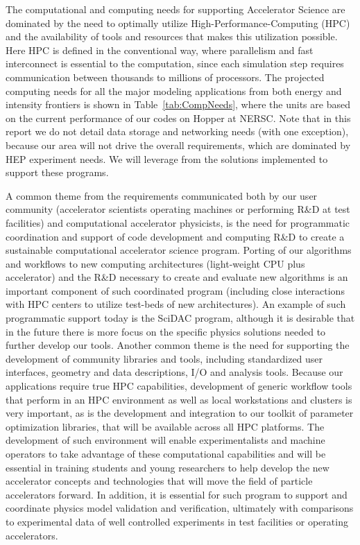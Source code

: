 The computational and computing needs for supporting Accelerator
Science are dominated by the need to optimally utilize
High-Performance-Computing (HPC) and the availability of tools
and resources that makes this utilization possible.  Here HPC is
defined in the conventional way, where parallelism and fast
interconnect is essential to the computation, since each
simulation step requires communication between thousands to
millions of processors. The projected computing  needs for all
the major modeling applications from both energy and intensity
frontiers is shown in Table~\ref{tab:CompNeeds}, where the units
are based on the current performance of our codes on Hopper at
NERSC. Note that in this report we do not detail data storage and
networking needs (with one exception), because our area will not
drive the overall requirements, which are dominated by HEP
experiment needs.  We will leverage from the solutions
implemented to support these programs.

A common theme from the requirements communicated both by our
user community (accelerator scientists operating machines or
performing R\&D at test facilities) and computational accelerator
physicists, is the need for programmatic coordination and support
of code development and computing R\&D to create a sustainable
computational accelerator science program.  Porting of our
algorithms and workflows to new computing architectures
(light-weight CPU plus accelerator) and the R\&D necessary to
create and evaluate new algorithms is an important component of
such coordinated program (including close interactions with HPC
centers to utilize test-beds of new architectures). An example of
such programmatic support today is the SciDAC program, although
it is desirable that in the future there is more focus on the
specific physics solutions needed to further develop our tools.  Another
common theme is the need for supporting the development of
community libraries and tools, including standardized user
interfaces, geometry and data descriptions, I/O and analysis tools.
Because our applications require true HPC capabilities,
development of generic workflow tools that perform in an HPC
environment as well as local workstations and clusters is very important, as is the development and
integration to our toolkit of parameter optimization libraries,
that will be available across all HPC platforms.  The development
of such environment will enable experimentalists and machine
operators to take advantage of these computational capabilities
and will be essential in training students and young researchers
to help develop the new accelerator concepts and technologies
that will move the field of particle accelerators forward.   In
addition, it is essential for such program to support and
coordinate physics model validation and verification, ultimately
with comparisons to experimental data of well controlled
experiments in test facilities or operating accelerators.

